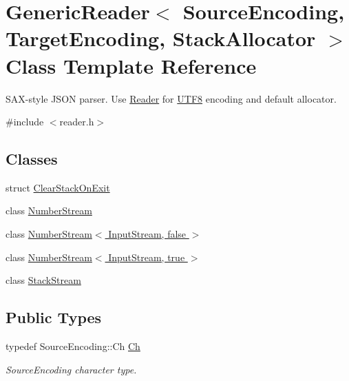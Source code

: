 \hypertarget{class_generic_reader}{}\section{Generic\+Reader$<$ Source\+Encoding, Target\+Encoding, Stack\+Allocator $>$ Class Template Reference}
\label{class_generic_reader}


S\+A\+X-\/style J\+S\+ON parser. Use \hyperlink{md_Commun_Externe_RapidJSON_doc_sax.zh-cn_Reader}{Reader} for \hyperlink{struct_u_t_f8}{U\+T\+F8} encoding and default allocator.  




{\ttfamily \#include $<$reader.\+h$>$}

\subsection*{Classes}
\begin{DoxyCompactItemize}
\item 
struct \hyperlink{struct_generic_reader_1_1_clear_stack_on_exit}{Clear\+Stack\+On\+Exit}
\item 
class \hyperlink{class_generic_reader_1_1_number_stream}{Number\+Stream}
\item 
class \hyperlink{class_generic_reader_1_1_number_stream_3_01_input_stream_00_01false_01_4}{Number\+Stream$<$ Input\+Stream, false $>$}
\item 
class \hyperlink{class_generic_reader_1_1_number_stream_3_01_input_stream_00_01true_01_4}{Number\+Stream$<$ Input\+Stream, true $>$}
\item 
class \hyperlink{class_generic_reader_1_1_stack_stream}{Stack\+Stream}
\end{DoxyCompactItemize}
\subsection*{Public Types}
\begin{DoxyCompactItemize}
\item 
typedef Source\+Encoding\+::\+Ch \hyperlink{class_generic_reader_ab39a92bb26d50aee6469df604622218a}{Ch}\hypertarget{class_generic_reader_ab39a92bb26d50aee6469df604622218a}{}\label{class_generic_reader_ab39a92bb26d50aee6469df604622218a}

\begin{DoxyCompactList}\small\item\em Source\+Encoding character type. \end{DoxyCompactList}\end{DoxyCompactItemize}
